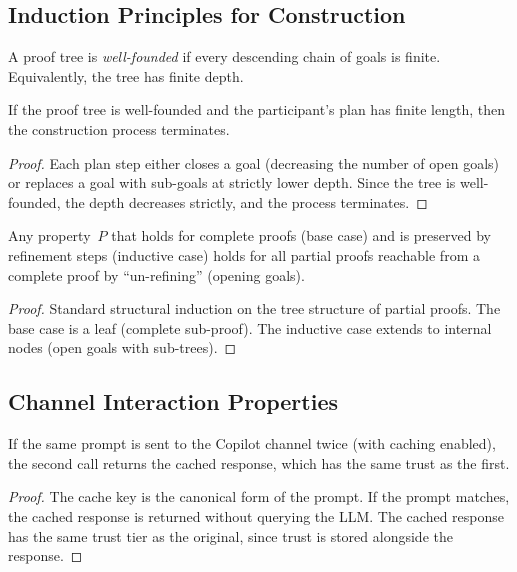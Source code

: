 \documentclass[11pt]{article}
\begin{document}
\subsection{Induction Principles for Construction}

\begin{definition}\label{def:wfpt}
A proof tree is \emph{well-founded} if every descending
chain of goals is finite.  Equivalently, the tree has
finite depth.
\end{definition}

\begin{lemma}%
\label{lem:confterm}
If the proof tree is well-founded and the participant's plan
has finite length, then the construction process terminates.
\end{lemma}
\begin{proof}
Each plan step either closes a goal (decreasing the number of
open goals) or replaces a goal with sub-goals at strictly
lower depth.  Since the tree is well-founded, the depth
decreases strictly, and the process terminates.
\end{proof}

\begin{lemma}%
\label{lem:structind}
Any property~$P$ that holds for complete proofs (base case)
and is preserved by refinement steps (inductive case) holds
for all partial proofs reachable from a complete proof by
``un-refining'' (opening goals).
\end{lemma}
\begin{proof}
Standard structural induction on the tree structure of
partial proofs.  The base case is a leaf (complete sub-proof).
The inductive case extends to internal nodes (open goals
with sub-trees).
\end{proof}

\subsection{Channel Interaction Properties}

\begin{lemma}%
\label{lem:cacheidemp}
If the same prompt is sent to the Copilot channel twice
(with caching enabled), the second call returns the cached
response, which has the same trust as the first.
\end{lemma}
\begin{proof}
The cache key is the canonical form of the prompt.  If the
prompt matches, the cached response is returned without
querying the LLM.  The cached response has the same trust
tier as the original, since trust is stored alongside the
response.
\end{proof}
\end{document}
